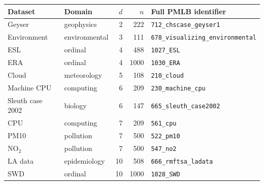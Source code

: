 \begin{tabular}{llrrl}
\toprule Dataset & Domain & $d$ & $n$ & Full PMLB identifier \\ \midrule
Geyser & geophysics & 2 & 222 & \texttt{712\_chscase\_geyser1} \\
Environment & environmental & 3 & 111 & \texttt{678\_visualizing\_environmental} \\
ESL & ordinal & 4 & 488 & \texttt{1027\_ESL} \\
ERA & ordinal & 4 & 1000 & \texttt{1030\_ERA} \\
Cloud & meteorology & 5 & 108 & \texttt{210\_cloud} \\
Machine CPU & computing & 6 & 209 & \texttt{230\_machine\_cpu} \\
Sleuth case 2002 & biology & 6 & 147 & \texttt{665\_sleuth\_case2002} \\
CPU & computing & 7 & 209 & \texttt{561\_cpu} \\
PM10 & pollution & 7 & 500 & \texttt{522\_pm10} \\
NO$_2$ & pollution & 7 & 500 & \texttt{547\_no2} \\
LA data & epidemiology & 10 & 508 & \texttt{666\_rmftsa\_ladata} \\
SWD & ordinal & 10 & 1000 & \texttt{1028\_SWD} \\
\bottomrule\end{tabular}
